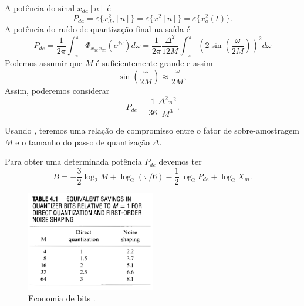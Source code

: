 \begin{frame}[allowframebreaks]
  \framebreak

  A potência do sinal $x_{da}[n]$ é
  \begin{equation}
  P_{da} = \varepsilon \{ x^2_{da}[n] \} = \varepsilon \{ x^2[n] \} = \varepsilon \{ x_a^2(t) \} .
  \end{equation}
  A potência do ruído de quantização final na saída é
  \begin{equation}
P_{de} = \frac{1}{2\pi} \int_{-\pi}^{\pi} \Phi_{x_{de} x_{de}} (e^{j\omega}) d\omega = \frac{1}{2\pi} \frac{\Delta^2}{12 M} \int_{-\pi}^{\pi} \left( 2 \sin \left( \frac{\omega}{2M} \right) \right)^2 d\omega
  \end{equation}
  Podemos assumir que $M$ é suficientemente grande e assim
  \begin{equation}
  \sin \left( \frac{\omega}{2M} \right) \approx \frac{\omega}{2M} ,
  \end{equation}
  Assim, poderemos considerar
  \begin{equation} 
  \label{eq-Pde-M}
  P_{de} = \frac{1}{36} \frac{\Delta^2 \pi^2}{M^3} .
  \end{equation}

  \framebreak

  Usando , teremos uma relação de compromisso entre o fator de sobre-amostragem $M$
  e o tamanho do passo de quantização $\Delta$.

  \vspace{2ex}
  Para obter uma determinada potência $P_{de}$ devemos ter
  \begin{equation}
  B = - \frac{3}{2} \log_2 M + \log_2 (\pi/6) - \frac{1}{2} \log_2 P_{de} + \log_2 X_m .
  \end{equation}


  \framebreak

  \begin{figure}[h!]
  \centering
  \includegraphics[width=0.5\textwidth]{images/oppenheim_tab41.png}
  \caption{Economia de bits \citep{oppenheim2009}.}
  \label{fig:oppenheim_tab41}
  \end{figure}


\end{frame}
